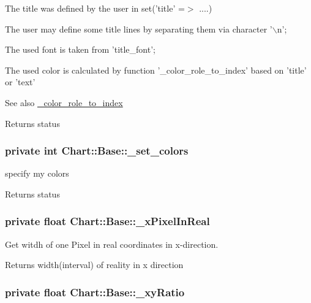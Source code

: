 The title was defined by the user in set('title' =$>$ ....)\par
 The user may define some title lines by separating them via character '$\backslash$n';\par
 The used font is taken from 'title\_\-font';\par
 The used color is calculated by function '\_\-color\_\-role\_\-to\_\-index' based on 'title' or 'text'\par
 \begin{DoxySeeAlso}{See also}
\hyperlink{classChart_1_1Base_a14098e898b9f9b5dca8d7a39ab9d4d57}{\_\-color\_\-role\_\-to\_\-index} 
\end{DoxySeeAlso}
\begin{DoxyReturn}{Returns}
status 
\end{DoxyReturn}
\hypertarget{classChart_1_1Base_addecc110eb46a126acaad69e113d06ea}{
\subsubsection[{\_\-set\_\-colors}]{\setlength{\rightskip}{0pt plus 5cm}private int {\bf Chart::Base::\_\-set\_\-colors}}}
\label{classChart_1_1Base_addecc110eb46a126acaad69e113d06ea}


specify my colors 

\begin{DoxyReturn}{Returns}
status 
\end{DoxyReturn}
\hypertarget{classChart_1_1Base_ac21e93fb6498ea3137e15fd348e7b9ff}{
\subsubsection[{\_\-xPixelInReal}]{\setlength{\rightskip}{0pt plus 5cm}private float {\bf Chart::Base::\_\-xPixelInReal}}}
\label{classChart_1_1Base_ac21e93fb6498ea3137e15fd348e7b9ff}


Get witdh of one Pixel in real coordinates in x-\/direction. 

\begin{DoxyReturn}{Returns}
width(interval) of reality in x direction 
\end{DoxyReturn}
\hypertarget{classChart_1_1Base_a1f3ae34864bf296fafcab63416926b83}{
\subsubsection[{\_\-xyRatio}]{\setlength{\rightskip}{0pt plus 5cm}private float {\bf Chart::Base::\_\-xyRatio}}}
\label{classChart_1_1Base_a1f3ae34864bf296fafcab63416926b83}


